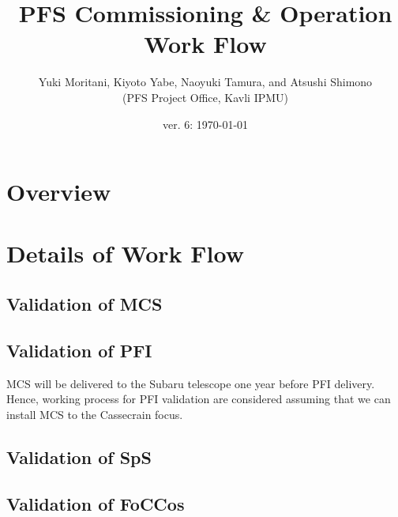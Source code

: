 \documentclass[11pt]{article}
\title{PFS Commissioning \& Operation Work Flow}
\author{Yuki Moritani, Kiyoto Yabe, Naoyuki Tamura, and Atsushi Shimono \\
(PFS Project Office, Kavli IPMU)}
\date{
ver. 6: \today}
\begin{document}
\maketitle
\tableofcontents

\section{Overview}


\section{Details of Work Flow}

\renewcommand{\thesubsubsection}{M-\;\arabic{subsubsection}}
\subsection{Validation of MCS}\label{sec:MCS}





\renewcommand{\thesubsubsection}{P-\;\arabic{subsubsection}}
\subsection{Validation of PFI}\label{sec:PFI}
MCS will be delivered to the Subaru telescope one year before PFI delivery.
Hence, working process for PFI validation are considered assuming that we can install MCS to the Cassecrain focus.










%
%
%

\renewcommand{\thesubsubsection}{S-\;\arabic{subsubsection}}
\subsection{Validation of SpS}\label{sec:SpS}


%

\renewcommand{\thesubsubsection}{F-\;\arabic{subsubsection}}
\subsection{Validation of FoCCos}\label{sec:FoCCoS}


\end{document}
